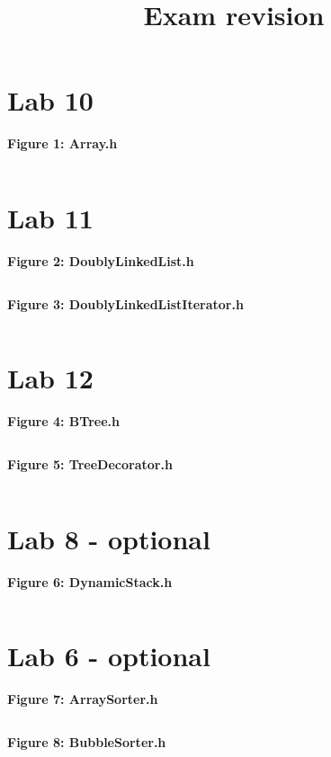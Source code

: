 \documentclass[11pt, letterpaper]{article}
\title{Exam revision}
\author{}
\date{}
\newcommand{\includeminted}[3]
{
  \begin{center}
  \textbf{#1}
  \vspace{-5pt}
  \inputminted[linenos, breaklines]{#2}{#3}
  \end{center}
}
\begin{document}
\normalsize
\section{Lab 10}
\includeminted{Figure 1: Array.h}{cpp}{../10/src/Array.h}
\clearpage
\section{Lab 11}
\includeminted{Figure 2: DoublyLinkedList.h}{cpp}{../11/src/DoublyLinkedList.h}
\clearpage
\includeminted{Figure 3: DoublyLinkedListIterator.h}{cpp}{../11/src/DoublyLinkedListIterator.h}
\clearpage
\section{Lab 12}
\includeminted{Figure 4: BTree.h}{cpp}{../12/src/BTree.h}
\clearpage
\includeminted{Figure 5: TreeDecorator.h}{cpp}{../12/src/TreeDecorator.h}
\clearpage
\section{Lab 8 - optional}
\includeminted{Figure 6: DynamicStack.h}{cpp}{../8/src/DynamicStack.h}
\clearpage
\section{Lab 6 - optional}
\includeminted{Figure 7: ArraySorter.h}{cpp}{../6/src/ArraySorter.h}
\clearpage
\includeminted{Figure 8: BubbleSorter.h}{cpp}{../6/src/BubbleSorter.h}
\clearpage
\end{document}
